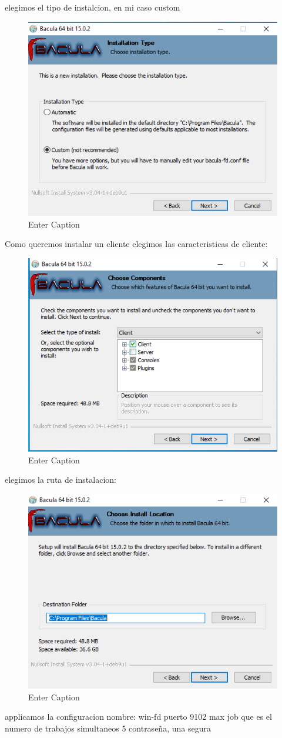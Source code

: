 elegimos el tipo de instalcion, en mi caso custom

\begin{figure}[H]
    \centering
    \includegraphics[width=0.5\linewidth]{instalacionBacula/custom.png}
    \caption{Enter Caption}
\end{figure}

Como queremos instalar un cliente elegimos las caracteristicas de cliente:
\begin{figure}[H]
    \centering
    \includegraphics[width=0.5\linewidth]{instalacionBacula/clientecaracteristicas.png}
    \caption{Enter Caption}
\end{figure}


elegimos la ruta de instalacion:
\begin{figure}[H]
    \centering
    \includegraphics[width=0.5\linewidth]{instalacionBacula/rutawindebacula.png}
    \caption{Enter Caption}
\end{figure}

applicamos la configuracion
nombre: win-fd
puerto 9102
max job que es el numero de trabajos simultaneos 5
contraseña, una segura


